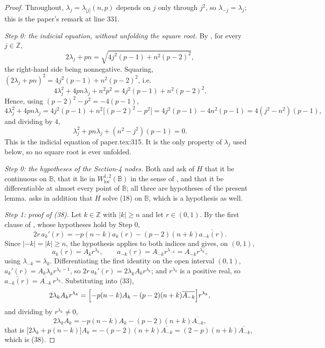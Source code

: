 \begin{proof}
Throughout, $\lambda_j=\lambda_{|j|}(n,p)$ depends on $j$ only through $j^2$, so
$\lambda_{-j}=\lambda_j$; this is the paper's remark at line 331.

\emph{Step 0: the indicial equation, without unfolding the square root.}  By
, for every $j\in\mathbb{Z}$,
\[
  2\lambda_j+pn=\sqrt{4j^2(p-1)+n^2(p-2)^2},
\]
the right-hand side being nonnegative.  Squaring,
$(2\lambda_j+pn)^2=4j^2(p-1)+n^2(p-2)^2$, i.e.
\[
  4\lambda_j^2+4pn\lambda_j+n^2p^2=4j^2(p-1)+n^2(p-2)^2 .
\]
Hence, using $(p-2)^2-p^2=-4(p-1)$,
\[
  4\lambda_j^2+4pn\lambda_j=4j^2(p-1)+n^2\bigl[(p-2)^2-p^2\bigr]
  =4j^2(p-1)-4n^2(p-1)=4(j^2-n^2)(p-1),
\]
and dividing by $4$,
\begin{equation}\tag{I}
  \lambda_j^2+pn\lambda_j+(n^2-j^2)(p-1)=0 .
\end{equation}
This is the indicial equation of paper.tex:315.  It is the only property of
$\lambda_j$ used below, so no square root is ever unfolded.

\emph{Step 0: the hypotheses of the Section-4 nodes.}  Both
 and  ask of $H$ that it
be continuous on $\mathbb{B}$, that it lie in
$W^{1,2}_{\mathrm{loc}}(\mathbb{B})$ in the sense of , and
that it be differentiable at almost every point of $\mathbb{B}$; all three are
hypotheses of the present lemma.   asks in addition
that $H$ solve (18) on $\mathbb{B}$, which is a hypothesis as well.

\emph{Step 1: proof of (38).}  Let $k\in\mathbb{Z}$ with $|k|\ge n$ and let
$r\in(0,1)$.  By the first clause of , whose
hypotheses hold by Step 0,
\begin{equation}\tag{33}
  2r\,a_k'(r)=-p(n-k)a_k(r)-(p-2)(n+k)\overline{a_{-k}(r)} .
\end{equation}
Since $|-k|=|k|\ge n$, the hypothesis applies to both indices and gives, on
$(0,1)$,
\[
  a_k(r)=A_kr^{\lambda_k},\qquad a_{-k}(r)=A_{-k}r^{\lambda_{-k}}=A_{-k}r^{\lambda_k},
\]
using $\lambda_{-k}=\lambda_k$.  Differentiating the first identity on the open
interval $(0,1)$,
$a_k'(r)=A_k\lambda_kr^{\lambda_k-1}$, so
$2r\,a_k'(r)=2\lambda_kA_kr^{\lambda_k}$; and $r^{\lambda_k}$ is a positive
real, so $\overline{a_{-k}(r)}=\overline{A_{-k}}\,r^{\lambda_k}$.  Substituting
into (33),
\[
  2\lambda_kA_kr^{\lambda_k}
  =\Bigl[-p(n-k)A_k-(p-2)(n+k)\overline{A_{-k}}\Bigr]r^{\lambda_k},
\]
and dividing by $r^{\lambda_k}\neq0$,
\[
  2\lambda_kA_k=-p(n-k)A_k-(p-2)(n+k)\overline{A_{-k}},
\]
that is $\bigl[2\lambda_k+p(n-k)\bigr]A_k=-(p-2)(n+k)\overline{A_{-k}}
=(2-p)(n+k)\overline{A_{-k}}$, which is (38).


\end{proof}

